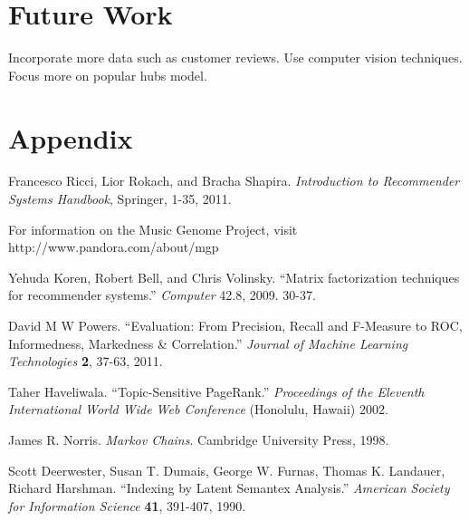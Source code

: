 \documentclass[11pt]{article}
\begin{document}
\section*{Future Work}
Incorporate more data such as customer reviews. Use computer vision techniques.
Focus more on popular hubs model.

\section*{Appendix}

\begin{thebibliography}{9}

    Francesco Ricci, Lior Rokach, and Bracha Shapira.
    \emph{Introduction to Recommender Systems Handbook}, Springer, 1-35, 2011.

    For information on the Music Genome Project, visit
    http://www.pandora.com/about/mgp

    Yehuda Koren, Robert Bell, and Chris Volinsky.
    ``Matrix factorization techniques for recommender systems.''
    \emph{Computer} 42.8, 2009. 30-37.

    David M W Powers.
    ``Evaluation: From Precision, Recall and F-Measure to ROC, Informedness,
Markedness \& Correlation.''
    \emph{Journal of Machine Learning Technologies} \textbf{2}, 37-63, 2011.

    Taher Haveliwala.
    ``Topic-Sensitive PageRank.''
    \emph{Proceedings of the Eleventh International World Wide Web Conference}
(Honolulu, Hawaii) 2002.

    James R. Norris.
    \emph{Markov Chains}. Cambridge University Press, 1998.

    Scott Deerwester, Susan T. Dumais, George W. Furnas, Thomas K. Landauer,
Richard Harshman.
    ``Indexing by Latent Semantex Analysis.''
    \emph{American Society for Information Science} \textbf{41}, 391-407, 1990.

\end{thebibliography}
\end{document}
